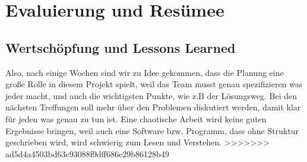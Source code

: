 \chapter{Evaluierung und Resümee}
\section{Wertschöpfung und Lessons Learned}
Also, nach einige Wochen sind wir zu Idee gekommen, dass die Planung eine große Rolle in diesem Projekt spielt, weil das Team musst genau spezifizieren was jeder macht, und auch die wichtigsten Punkte, wie z.B der Lösungsweg. Bei den nächsten Treffungen soll mehr über den Problemen diskutiert werden, damit klar für jeden was genau zu tun ist. Eine chaotische Arbeit wird keine guten Ergebnisse bringen, weil auch eine Software bzw. Programm, dass ohne Struktur geschrieben wird, wird schwierig zum Lesen und Verstehen.
>>>>>>> ad5d4a4503bd63c93088f9dff686e29b86128b49
